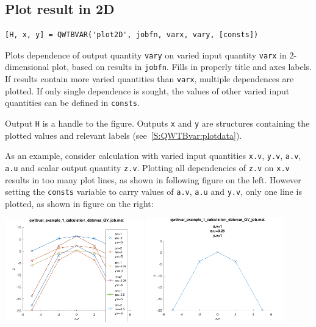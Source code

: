 \documentclass[12pt,a4paper,oneside]{report} %
\newcommand{\li}[1]{\lstinline{#1}}     %
\begin{document}
\subsection{Plot result in 2D}
\label{S:QWTBvar:plot2D}
\begin{lstlisting}
[H, x, y] = QWTBVAR('plot2D', jobfn, varx, vary, [consts])
\end{lstlisting}
Plots dependence of output quantity \li{vary} on varied input quantity
\li{varx} in 2-dimensional plot, based on results in \li{jobfn}.
Fills in properly title and axes labels. If results contain more varied
quantities than \li{varx}, multiple dependences are plotted.
If only single dependence is sought, the values of other varied input quantities
can be defined in \li{consts}.

Output \li{H} is a handle to the figure. Outputs \li{x} and \li{y} are
structures containing the plotted values and relevant labels
(see~\ref{S:QWTBvar:plotdata}).

As an example, consider calculation with varied input quantities \li{x.v},
\li{y.v}, \li{a.v}, \li{a.u} and scalar output quantity \li{z.v}. Plotting all
dependencies of \li{z.v} on \li{x.v} results in too many plot lines, as shown
in following figure on the left. However setting the \li{consts} variable to
carry values of \li{a.v}, \li{a.u} and \li{y.v}, only one line is plotted, as
shown in figure on the right:

\begin{center}
    \includegraphics[width=0.45\textwidth]{sources/QWTBvar_plot2D_no_consts.pdf}
    \hfill
    \includegraphics[width=0.45\textwidth]{sources/QWTBvar_plot2D_w_consts.pdf}
\end{center}
\end{document}
